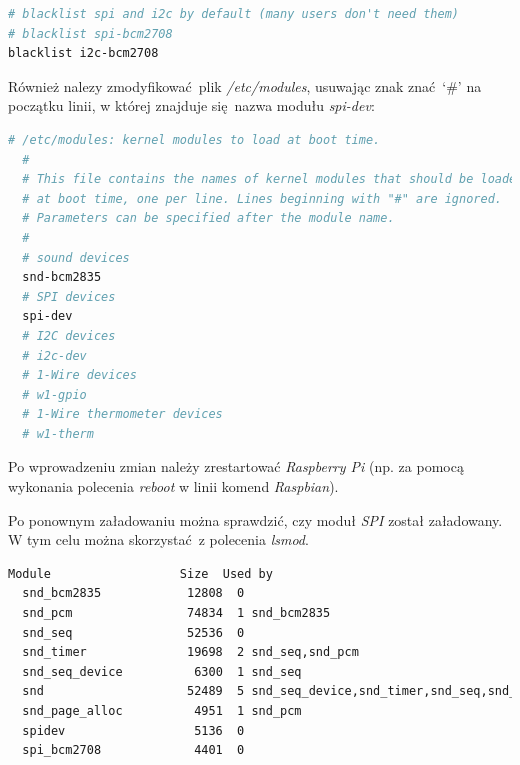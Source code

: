 \documentclass[eng,printmode]{mgr}
\begin{document}
\vspace{0.5cm}
\begin{lstlisting}[language=bash,frame=single,caption={Zmodyfikowany plik \emph{/etc/modprobe.d/raspi-blacklist.conf}}]
# blacklist spi and i2c by default (many users don't need them)
# blacklist spi-bcm2708
blacklist i2c-bcm2708
\end{lstlisting}

Również nalezy zmodyfikować plik \emph{/etc/modules}, usuwając znak znać `\#' na początku linii, w której znajduje się nazwa modułu \emph{spi-dev}:
\vspace{0.5cm}

\begin{minipage}{\textwidth}
  \begin{lstlisting}[language=bash,frame=single,caption={Zmodyfikowany plik \emph{/etc/modules}}]
  # /etc/modules: kernel modules to load at boot time.  
  #  
  # This file contains the names of kernel modules that should be loaded  
  # at boot time, one per line. Lines beginning with "#" are ignored.  
  # Parameters can be specified after the module name.  
  #  
  # sound devices  
  snd-bcm2835  
  # SPI devices  
  spi-dev  
  # I2C devices  
  # i2c-dev  
  # 1-Wire devices  
  # w1-gpio  
  # 1-Wire thermometer devices  
  # w1-therm 
  \end{lstlisting} 
\end{minipage}

Po wprowadzeniu zmian należy zrestartować \emph{Raspberry Pi} (np. za pomocą wykonania polecenia \emph{reboot} w linii komend \emph{Raspbian}). 

Po ponownym załadowaniu można sprawdzić, czy moduł \emph{SPI} został załadowany. W tym celu można skorzystać z polecenia \emph{lsmod}.
\vspace{0.5cm}

\begin{minipage}{\textwidth}
  \begin{lstlisting}[language=bash,frame=single,caption={Wynik wykonania polecenia \emph{lsmod}}]
  Module                  Size  Used by
  snd_bcm2835            12808  0
  snd_pcm                74834  1 snd_bcm2835
  snd_seq                52536  0
  snd_timer              19698  2 snd_seq,snd_pcm
  snd_seq_device          6300  1 snd_seq
  snd                    52489  5 snd_seq_device,snd_timer,snd_seq,snd_pcm,snd_bcm2835
  snd_page_alloc          4951  1 snd_pcm
  spidev                  5136  0
  spi_bcm2708             4401  0
  \end{lstlisting} 
\end{minipage}
\end{document}
